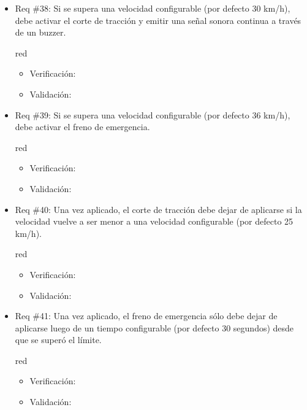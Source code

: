 \documentclass[11pt]{charter}
\begin{document}
\begin{itemize}
\item Req \#38: Si se supera una velocidad configurable (por defecto 30 km/h), debe activar el corte de tracción y emitir una señal sonora continua a través de un buzzer.
\begin{consigna}{red}
\begin{itemize}
  \item Verificación:\\
  \item Validación:\\
\end{itemize}
\end{consigna}

\item Req \#39: Si se supera una velocidad configurable (por defecto 36 km/h), debe activar el freno de emergencia.
\begin{consigna}{red}
\begin{itemize}
  \item Verificación:\\
  \item Validación:\\
\end{itemize}
\end{consigna}

\item Req \#40: Una vez aplicado, el corte de tracción debe dejar de aplicarse si la velocidad vuelve a ser menor a una velocidad configurable (por defecto 25 km/h).
\begin{consigna}{red}
\begin{itemize}
  \item Verificación:\\
  \item Validación:\\
\end{itemize}
\end{consigna}

\item Req \#41: Una vez aplicado, el freno de emergencia sólo debe dejar de aplicarse luego de un tiempo configurable (por defecto 30 segundos) desde que se superó el límite.
\begin{consigna}{red}
\begin{itemize}
  \item Verificación:\\
  \item Validación:\\
\end{itemize}
\end{consigna}


\end{itemize}
\end{document}
